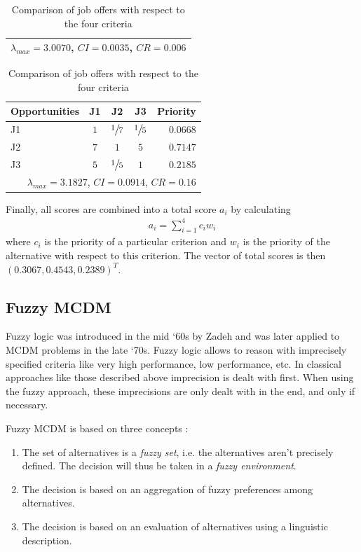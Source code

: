 \begin{table}[h]
\begin{tabular}{lcccr}
        \hline
        \multicolumn{5}{r}{$\lambda_{max} = 3.0070$, $CI = 0.0035$, $CR = 0.006$}   \\
        \hline
    \end{tabular}
    \hfill
    \begin{tabular}{lcccr}
        \hline
        \textbf{Opportunities} & J1  & J2              & J3              & Priority \\
        \hline
        J1                     & $1$ & ${\large \sfrac{1}{7}}$ & ${\large \sfrac{1}{5}}$ & $0.0668$ \\
        J2                     & $7$ & $1$             & $5$             & $0.7147$ \\
        J3                     & $5$ & ${\large \sfrac{1}{5}}$ & $1$             & $0.2185$ \\        
        \hline
        \multicolumn{5}{r}{$\lambda_{max} = 3.1827$, $CI = 0.0914$, $CR = 0.16$}    \\
        \hline
    \end{tabular}
    \caption{Comparison of job offers with respect to the four criteria}
    \label{tab:ahp-alternatives}
\end{table}

Finally, all scores are combined into a total score $a_i$ by calculating
\begin{gather*}
    a_i = \sum_{i = 1}^{4} c_i w_i
\end{gather*}
where $c_i$ is the priority of a particular criterion and $w_i$ is the priority of the alternative with respect to this criterion. The vector of total scores is then $(0.3067, 0.4543, 0.2389)^T$.

\subsection{Fuzzy MCDM}
\label{sec:fuzzy}

Fuzzy logic was introduced in the mid `60s by Zadeh and was later applied to MCDM problems in the late `70s. Fuzzy logic allows to reason with imprecisely specified criteria like very high performance, low performance, etc. In classical approaches like those described above imprecision is dealt with first. When using the fuzzy approach, these imprecisions are only dealt with in the end, and only if necessary.

Fuzzy MCDM is based on three concepts \cite{FuzzySetApproach}:

\begin{enumerate}
    \item The set of alternatives is a \emph{fuzzy set}, i.e. the alternatives aren't precisely defined. The decision will thus be taken in a \emph{fuzzy environment}. 
    \item The decision is based on an aggregation of fuzzy preferences among alternatives.
    \item The decision is based on an evaluation of alternatives using a linguistic description.
\end{enumerate}

